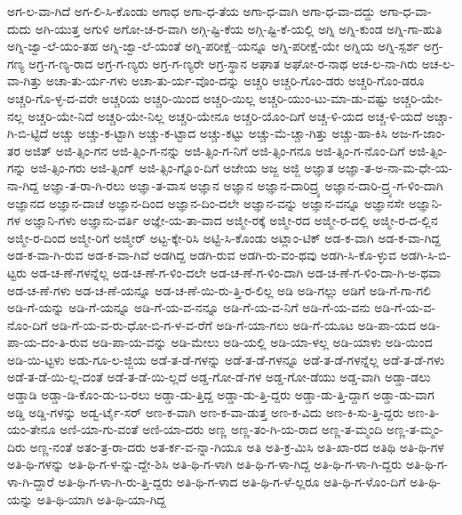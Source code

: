 {ಅಗ-ಲ-ವಾ-ಗಿದೆ
ಅಗ-ಲಿ-ಸಿ-ಕೊಂಡು
ಅಗಾಧ
ಅಗಾ-ಧ-ತೆಯ
ಅಗಾ-ಧ-ವಾಗಿ
ಅಗಾ-ಧ-ವಾ-ದದ್ದು
ಅಗಾ-ಧ-ವಾ-ದುದು
ಅಗಿ-ಯುತ್ತ
ಅಗುಳಿ
ಅಗೋ-ಚ-ರ-ವಾಗಿ
ಅಗ್ಗಿ-ಷ್ಟಿ-ಕೆಯ
ಅಗ್ಗಿ-ಷ್ಟಿ-ಕೆ-ಯಲ್ಲಿ
ಅಗ್ನಿ
ಅಗ್ನಿ-ಕುಂಡ
ಅಗ್ನಿ-ಗಾ-ಹುತಿ
ಅಗ್ನಿ-ಜ್ವಾ-ಲೆ-ಯಂ-ತಹ
ಅಗ್ನಿ-ಜ್ವಾ-ಲೆ-ಯಂತೆ
ಅಗ್ನಿ-ಪರೀಕ್ಷೆ--ಯನ್ನೂ
ಅಗ್ನಿ-ಪರೀಕ್ಷೆ-ಯೇ
ಅಗ್ನಿಯ
ಅಗ್ನಿ-ಸ್ಪರ್ಶ
ಅಗ್ರ-ಗಣ್ಯ
ಅಗ್ರ-ಗ-ಣ್ಯ-ರಾದ
ಅಗ್ರ-ಗ-ಣ್ಯರು
ಅಗ್ರ-ಗ-ಣ್ಯರೇ
ಅಗ್ರ-ಸ್ಥಾನ
ಅಘಾತ
ಅಘೋ-ರ-ನಾಥ
ಅಚ-ಲ-ನಾ-ಗಿರು
ಅಚ-ಲ-ವಾ-ಗಿತ್ತು
ಅಚಾ-ತು-ರ್ಯ-ಗಳು
ಅಚಾ-ತು-ರ್ಯ-ವೊಂ-ದನ್ನು
ಅಚ್ಚರಿ
ಅಚ್ಚರಿ-ಗೊಂ-ಡರು
ಅಚ್ಚರಿ-ಗೊಂ-ಡರೂ
ಅಚ್ಚರಿ-ಗೊ-ಳ್ಳ-ದ-ವರೇ
ಅಚ್ಚರಿಯ
ಅಚ್ಚರಿ-ಯಿಂದ
ಅಚ್ಚರಿ-ಯಿಲ್ಲ
ಅಚ್ಚರಿ-ಯುಂ-ಟು-ಮಾ-ಡು-ವಷ್ಟು
ಅಚ್ಚರಿ-ಯೇ-ನಲ್ಲ
ಅಚ್ಚರಿ-ಯೇ-ನಿದೆ
ಅಚ್ಚರಿ-ಯೇ-ನಿಲ್ಲ
ಅಚ್ಚರಿ-ಯೇನೂ
ಅಚ್ಚರಿ-ಯೊಂ-ದಿಗೆ
ಅಚ್ಚ-ಳಿ-ಯದ
ಅಚ್ಚ-ಳಿ-ಯದೆ
ಅಚ್ಚಾ-ಗಿ-ಬಿ-ಟ್ಟಿದೆ
ಅಚ್ಚು
ಅಚ್ಚು-ಕ-ಟ್ಟಾಗಿ
ಅಚ್ಚು-ಕ-ಟ್ಟಾದ
ಅಚ್ಚು-ಕಟ್ಟು
ಅಚ್ಚು-ಮೆ-ಚ್ಚಾ-ಗಿತ್ತು
ಅಚ್ಚು-ಹಾ-ಕಿಸಿ
ಅಜ-ಗ-ಜಾಂ-ತರ
ಅಜಿತ್
ಅಜಿ-ತ್ಸಿಂ-ಗನ
ಅಜಿ-ತ್ಸಿಂ-ಗ-ನನ್ನು
ಅಜಿ-ತ್ಸಿಂ-ಗ-ನಿಗೆ
ಅಜಿ-ತ್ಸಿಂ-ಗನೂ
ಅಜಿ-ತ್ಸಿಂ-ಗ-ನೊಂ-ದಿಗೆ
ಅಜಿ-ತ್ಸಿಂ-ಗನ್ನು
ಅಜಿ-ತ್ಸಿಂ-ಗರು
ಅಜಿ-ತ್ಸಿಂಗ್
ಅಜಿ-ತ್ಸಿಂ-ಗ್ನೊಂ-ದಿಗೆ
ಅಜೇಯ
ಅಜ್ಜ
ಅಜ್ಜಿ
ಅಜ್ಞಾತ
ಅಜ್ಞಾ-ತ-ಅ-ನಾ-ಮ-ಧೇ-ಯ-ನಾ-ಗಿದ್ದ
ಅಜ್ಞಾ-ತ-ರಾ-ಗಿ-ರಲು
ಅಜ್ಞಾ-ತ-ವಾಸ
ಅಜ್ಞಾನ
ಅಜ್ಞಾನ
ಅಜ್ಞಾನ-ದಾರಿದ್ರ್ಯ
ಅಜ್ಞಾನ-ದಾರಿ-ದ್ರ್ಯ-ಗ-ಳಿಂ-ದಾಗಿ
ಅಜ್ಞಾನದ
ಅಜ್ಞಾನ-ದಾಚೆ
ಅಜ್ಞಾನ-ದಿಂದ
ಅಜ್ಞಾನ-ದಿಂ-ದಲೇ
ಅಜ್ಞಾನ-ವನ್ನು
ಅಜ್ಞಾನ-ವನ್ನೂ
ಅಜ್ಞಾನಸೇ
ಅಜ್ಞಾನಿ-ಗಳ
ಅಜ್ಞಾನಿ-ಗಳು
ಅಜ್ಞಾನು-ವರ್ತಿ
ಅಜ್ಞೇ-ಯ-ತಾ-ವಾದ
ಅಜ್ಮೀ-ರಕ್ಕೆ
ಅಜ್ಮೀ-ರದ
ಅಜ್ಮೀ-ರ-ದಲ್ಲಿ
ಅಜ್ಮೀ-ರ-ದ-ಲ್ಲಿನ
ಅಜ್ಮೀ-ರ-ದಿಂದ
ಅಜ್ಮೀ-ರಿಗೆ
ಅಜ್ಮೀರ್
ಅಟ್ಟ-ಕ್ಕೇ-ರಿಸಿ
ಅಟ್ಟಿ-ಸಿ-ಕೊಂಡು
ಅಟ್ಲಾಂ-ಟಿಕ್
ಅಡ-ಕ-ವಾಗಿ
ಅಡ-ಕ-ವಾ-ಗಿದ್ದ
ಅಡ-ಕ-ವಾ-ಗಿ-ರುವ
ಅಡ-ಕ-ವಾ-ಗಿವೆ
ಅಡಗಿದ್ದ
ಅಡಗಿ-ರುವ
ಅಡಗಿ-ರು-ವಂ-ಥವು
ಅಡಗಿ-ಸಿ-ಕೊ-ಳ್ಳುವ
ಅಡಗಿ-ಸಿ-ಬಿ-ಟ್ಟರು
ಅಡ-ಚ-ಣೆ-ಗಳನ್ನೆಲ್ಲ
ಅಡ-ಚ-ಣೆ-ಗ-ಳಿಂ-ದಲೇ
ಅಡ-ಚ-ಣೆ-ಗ-ಳಿಂ-ದಾಗಿ
ಅಡ-ಚ-ಣೆ-ಗ-ಳಿಂ-ದಾ-ಗಿ-ಅ-ಥವಾ
ಅಡ-ಚ-ಣೆ-ಗಳು
ಅಡ-ಚ-ಣೆ-ಯನ್ನೂ
ಅಡ-ಚ-ಣೆ-ಯಿ-ರು-ತ್ತಿ-ರ-ಲಿಲ್ಲ
ಅಡಿ
ಅಡಿ-ಗಲ್ಲು
ಅಡಿಗೆ
ಅಡಿ-ಗೆ-ಗಾ-ಗಲಿ
ಅಡಿ-ಗೆ-ಯನ್ನು
ಅಡಿ-ಗೆ-ಯನ್ನೂ
ಅಡಿ-ಗೆ-ಯ-ವ-ನನ್ನೂ
ಅಡಿ-ಗೆ-ಯ-ವ-ನಿಗೆ
ಅಡಿ-ಗೆ-ಯ-ವನು
ಅಡಿ-ಗೆ-ಯ-ವ-ನೊಂ-ದಿಗೆ
ಅಡಿ-ಗೆ-ಯ-ವ-ರು-ಧೋ-ಬಿ-ಗ-ಳ-ವ-ರೆಗೆ
ಅಡಿ-ಗೆ-ಯಾ-ಗಲು
ಅಡಿ-ಗೆ-ಯೂಟ
ಅಡಿ-ಪಾ-ಯದ
ಅಡಿ-ಪಾ-ಯ-ದಂ-ತಿ-ರುವ
ಅಡಿ-ಪಾ-ಯ-ವನ್ನು
ಅಡಿ-ಮೇಲು
ಅಡಿ-ಯಲ್ಲಿ
ಅಡಿ-ಯಾ-ಳಲ್ಲ
ಅಡಿ-ಯಾಳು
ಅಡಿ-ಯಿಂದ
ಅಡಿ-ಯಿ-ಟ್ಟಳು
ಅಡು-ಗೂ-ಲ-ಜ್ಜಿಯ
ಅಡೆ-ತ-ಡೆ-ಗಳನ್ನು
ಅಡೆ-ತ-ಡೆ-ಗಳನ್ನೂ
ಅಡೆ-ತ-ಡೆ-ಗಳನ್ನೆಲ್ಲ
ಅಡೆ-ತ-ಡೆ-ಗಳು
ಅಡೆ-ತ-ಡೆ-ಯಿ-ಲ್ಲ-ದಂತೆ
ಅಡೆ-ತ-ಡೆ-ಯಿ-ಲ್ಲದೆ
ಅಡ್ಡ-ಗೋ-ಡೆ-ಗಳ
ಅಡ್ಡ-ಗೋ-ಡೆಯು
ಅಡ್ಡ-ವಾಗಿ
ಅಡ್ಡಾ-ಡಲು
ಅಡ್ಡಾಡಿ
ಅಡ್ಡಾ-ಡಿ-ಕೊಂ-ಡು-ಬ-ರಲು
ಅಡ್ಡಾ-ಡು-ತ್ತಿದ್ದ
ಅಡ್ಡಾ-ಡು-ತ್ತಿ-ದ್ದರು
ಅಡ್ಡಾ-ಡು-ತ್ತಿ-ದ್ದಾಗ
ಅಡ್ಡಾ-ಡು-ವಾಗ
ಅಡ್ಡಿ
ಅಡ್ಡಿ-ಗಳನ್ನು
ಅಡ್ವ-ರ್ಟೈ-ಸರ್
ಅಣ-ಕ-ವಾಗಿ
ಅಣ-ಕ-ವಾ-ಡುತ್ತ
ಅಣ-ಕ-ವಿದು
ಅಣ-ಕಿ-ಸು-ತ್ತಿ-ದ್ದರು
ಅಣ-ತಿ-ಯಂ-ತೇನೂ
ಅಣಿ-ಯಾ-ಗು-ವಂತೆ
ಅಣಿ-ಯಾ-ದರು
ಅಣ್ಣ
ಅಣ್ಣ-ತಂ-ಗಿ-ಯ-ರಾದ
ಅಣ್ಣ-ತ-ಮ್ಮಂದಿ
ಅಣ್ಣ-ತ-ಮ್ಮಂ-ದಿರು
ಅಣ್ಣ-ನಂತೆ
ಅತಂ-ತ್ರ-ರಾ-ದರು
ಅತ-ರ್ಕ-ವ-ನ್ನಾ-ಗಿಯೂ
ಅತಿ
ಅತಿ-ಕ್ರ-ಮಿಸಿ
ಅತಿ-ಖಾ-ರದ
ಅತಿಥಿ
ಅತಿ-ಥಿ-ಗಳ
ಅತಿ-ಥಿ-ಗಳನ್ನು
ಅತಿ-ಥಿ-ಗ-ಳ-ನ್ನು-ದ್ದೇ-ಶಿಸಿ
ಅತಿ-ಥಿ-ಗ-ಳಾಗಿ
ಅತಿ-ಥಿ-ಗ-ಳಾ-ಗಿದ್ದ
ಅತಿ-ಥಿ-ಗ-ಳಾ-ಗಿ-ದ್ದರು
ಅತಿ-ಥಿ-ಗ-ಳಾ-ಗಿ-ದ್ದಾರೆ
ಅತಿ-ಥಿ-ಗ-ಳಾ-ಗಿ-ರು-ತ್ತಿ-ದ್ದರು
ಅತಿ-ಥಿ-ಗ-ಳಾದ
ಅತಿ-ಥಿ-ಗ-ಳೆ-ಲ್ಲರೂ
ಅತಿ-ಥಿ-ಗ-ಳೊಂ-ದಿಗೆ
ಅತಿ-ಥಿ-ಯನ್ನು
ಅತಿ-ಥಿ-ಯಾಗಿ
ಅತಿ-ಥಿ-ಯಾ-ಗಿದ್ದ
}
